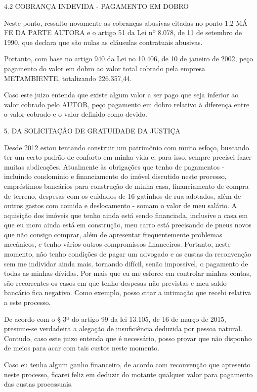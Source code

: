\documentclass[11pt]{letter}
\begin{document}
4.2 COBRANÇA INDEVIDA - PAGAMENTO EM DOBRO

Neste ponto, ressalto novamente as cobranças abusivas citadas no ponto 1.2 MÁ FE DA PARTE AUTORA e o artigo 51 da Lei nº 8.078, de 11 de setembro de 1990, que declara que são nulas as cláusulas contratuais abusivas. 

Portanto, com base no artigo 940 da Lei no 10.406, de 10 de janeiro de 2002, peço pagamento do valor em dobro ao valor total cobrado pela empresa METAMBIENTE, totalizando 226.357,44.

Caso este juizo entenda que existe algum valor a ser pago que seja inferior ao valor cobrado pelo AUTOR, peço pagamento em dobro relativo à diferença entre o valor cobrado e o valor definido como devido. 

5. DA SOLICITAÇÃO DE GRATUIDADE DA JUSTIÇA

Desde 2012 estou tentando construir um patrimônio com muito esfoço, buscando ter um certo padrão de conforto em minha vida e, para isso, sempre precisei fazer muitas abdicações. Atualmente às obrigações que tenho de pagamentos - incluindo condomínio e financiamento do imóvel discutido neste processo, empréstimos bancários para construção de minha casa, financiamento de compra de terreno, despesas com os cuidados de 16 gatinhos de rua adotados, além de outros gastos com comida e deslocamento - somam o valor de meu salário. A aquisição dos imóveis que tenho ainda está sendo financiada, inclusive a casa em que eu moro ainda está em construção, meu carro está precisando de pneus novos que não consigo comprar, além de apresentar frequentemente problemas mecânicos, e tenho vários outros compromissos financeiros. Portanto, neste momento, não tenho condições de pagar um advogado e as custas da reconvenção sem me individar ainda mais, tornando difícil, senão impossível, o pagamento de todas as minhas dívidas. Por mais que eu me esforce em controlar minhas contas, são recorrentes os casos em que tenho despesas não previstas e meu saldo bancário fica negativo. Como exemplo, posso citar a intimação que recebi relativa a este processo.

De acordo com o § 3º do artigo 99 da lei 13.105, de 16 de março de 2015, presume-se verdadeira a alegação de insuficiência deduzida por pessoa natural. Contudo, caso este juizo entenda que é necessário, posso provar que não disponho de meios para acar com tais custos neste momento.

Caso eu tenha algum ganho financeiro, de acordo com reconvenção que apresento neste processo, ficarei feliz em deduzir do motante qualquer valor para pagamento das custas processuais.
\end{document}
